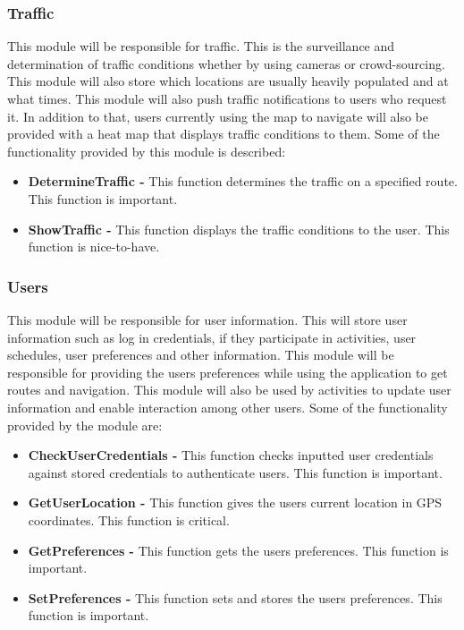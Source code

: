 \documentclass[a4paper,12pt]{article}
\begin{document}
\subsubsection{Traffic}
This module will be responsible for traffic. This is the surveillance and determination of traffic conditions whether by using cameras or crowd-sourcing. This module will also store which locations are usually heavily populated and at what times. This module will also push traffic notifications to users who request it. In addition to that, users currently using the map to navigate will also be provided with a heat map that displays traffic conditions to them. Some of the functionality provided by this module is described:
\begin{itemize}
\item \textbf{DetermineTraffic -} This function determines the traffic on a specified route. This function is important.
\item \textbf{ShowTraffic -} This function displays the traffic conditions to the user. This function is nice-to-have.
\end{itemize}

\subsubsection{Users}
This module will be responsible for user information. This will store user information such as log in credentials, if they participate in activities, user schedules, user preferences and other information. This module will be responsible for providing the users preferences while using the application to get routes and navigation. This module will also be used by activities to update user information and enable interaction among other users. Some of the functionality provided by the module are: 
\begin{itemize}
\item \textbf{CheckUserCredentials -} This function checks inputted user credentials against stored credentials to authenticate users. This function is important.
\item \textbf{GetUserLocation -} This function gives the users current location in GPS coordinates. This function is critical.
\item \textbf{GetPreferences -} This function gets the users preferences. This function is important.
\item \textbf{SetPreferences -} This function sets and stores the users preferences. This function is important.
\end{itemize}
\end{document}
